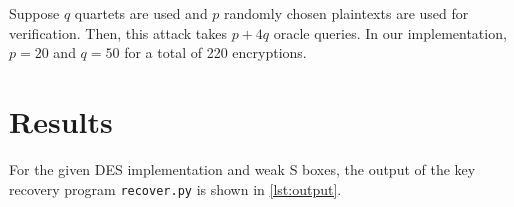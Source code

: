 \documentclass[journal,12pt,twocolumn]{IEEEtran}
\begin{document}
Suppose \(q\) quartets are used and \(p\) randomly chosen plaintexts are used
for verification. Then, this attack takes \(p + 4q\) oracle queries. In our
implementation, \(p = 20\) and \(q = 50\) for a total of 220 encryptions.

\section{Results}
\label{sec:results}

For the given DES implementation and weak S boxes, the output of the key
recovery program \texttt{recover.py} is shown in \autoref{lst:output}.



\end{document}
